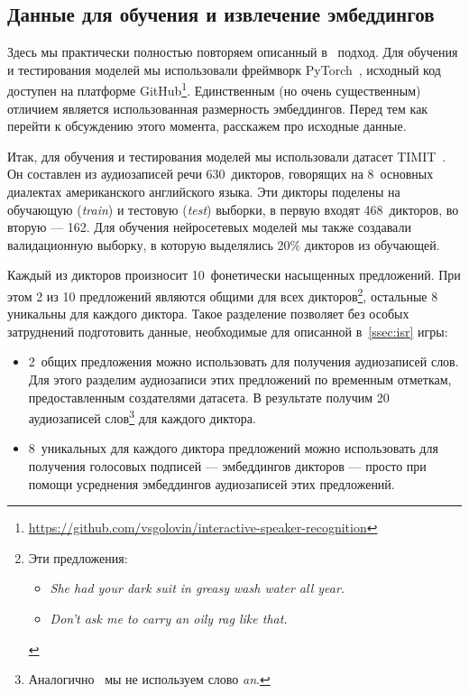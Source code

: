 \subsection{Данные для обучения и извлечение эмбеддингов}\label{ssec:data}

Здесь мы практически полностью повторяем описанный в~\cite{isrpaper} подход.
Для обучения и тестирования моделей мы использовали фреймворк
PyTorch~\cite{pytorch}, исходный код доступен на платформе GitHub\footnote{
    \href{https://github.com/vsgolovin/interactive-speaker-recognition}
    {https://github.com/vsgolovin/interactive-speaker-recognition}
}. Единственным (но очень существенным) отличием является использованная
размерность эмбеддингов. Перед тем как перейти к обсуждению этого момента,
расскажем про исходные данные.

Итак, для обучения и тестирования моделей мы использовали датасет
TIMIT~\cite{timit}. Он составлен из аудиозаписей речи 630~дикторов, говорящих на
8~основных диалектах американского английского языка. Эти дикторы поделены на
обучающую (\textit{train}) и тестовую (\textit{test}) выборки, в первую входят
468~дикторов, во вторую --- 162. Для обучения нейросетевых моделей мы также
создавали валидационную выборку, в которую выделялись 20\% дикторов из
обучающей.

Каждый из дикторов произносит 10~фонетически насыщенных предложений. При этом 2
из 10 предложений являются общими для всех дикторов\footnote{
    Эти предложения:
    \begin{itemize}
        \item \textit{She had your dark suit in greasy wash water all year.}
        \item \textit{Don't ask me to carry an oily rag like that.}
    \end{itemize}
}, остальные 8 уникальны для каждого диктора. Такое разделение позволяет без
особых затруднений подготовить данные, необходимые для описанной
в~\ref{ssec:isr} игры:
\begin{itemize}
    \item 2~общих предложения можно использовать для получения аудиозаписей
    слов.  Для этого разделим аудиозаписи этих предложений по временным
    отметкам, предоставленным создателями датасета. В результате получим 20
    аудиозаписей слов\footnote{Аналогично~\cite{isrpaper} мы не используем слово
    \textit{an}.} для каждого диктора.
    \item 8~уникальных для каждого диктора предложений можно использовать для
    получения голосовых подписей --- эмбеддингов дикторов --- просто при помощи
    усреднения эмбеддингов аудиозаписей этих предложений.
\end{itemize}

